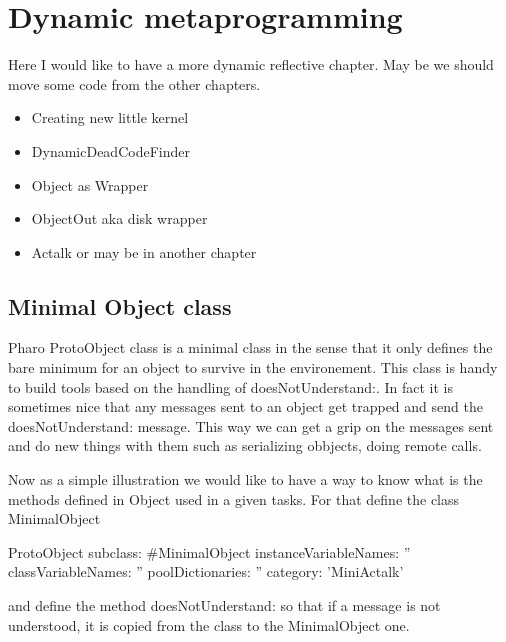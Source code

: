 \documentclass[a4paper,10pt,twoside]{book}
\begin{document}
	\sloppy
\fi
\chapter{Dynamic metaprogramming}

Here I would like to have a more dynamic reflective chapter.
May be we should move some code from the other chapters.

	
\begin{itemize}
\item Creating new little kernel


\item DynamicDeadCodeFinder 

\item Object as Wrapper

\item ObjectOut aka disk wrapper

\item Actalk or may be in another chapter
\end{itemize}



\section{Minimal Object class}

Pharo ProtoObject class is a minimal class in the sense that it only defines the bare minimum for an object to survive in the environement. This class is handy to build tools based on the handling of doesNotUnderstand:.
In fact it is sometimes nice that any messages sent to an object get trapped and send the doesNotUnderstand: message.
This way we can get a grip on the messages sent and do new things with them such as serializing obbjects, doing remote calls.

Now as a simple illustration we would like to have a way to know what is the methods defined in Object used in a given tasks. 
For that define the class MinimalObject

\begin{classdef}{}
ProtoObject subclass: #MinimalObject
	instanceVariableNames: ''
	classVariableNames: ''
	poolDictionaries: ''
	category: 'MiniActalk'
\end{classdef}

and define the method doesNotUnderstand: so that if a message is not understood, it is copied from the class 
to the MinimalObject one. 
\end{document}
